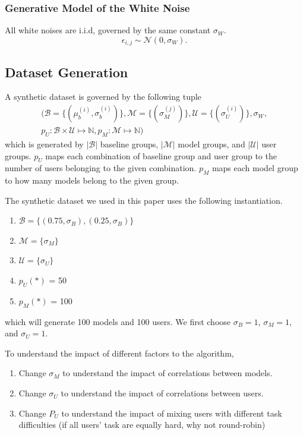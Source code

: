 \documentclass[letterpaper]{vldb}
\begin{document}
\subsubsection{Generative Model of the White Noise}

All white noises are i.i.d, governed by the same constant $\sigma_W$.
\[
\epsilon_{i,j} \sim \mathcal{N}(0, \sigma_W).
\]


\subsection{Dataset Generation}

A synthetic dataset is governed by the following tuple
\begin{eqnarray*}
( 
\mathcal{B} = \{(\mu_b^{(i)}, \sigma_b^{(i)})\},
\mathcal{M} = \{(\sigma_M^{(j)})\},
\mathcal{U} = \{(\sigma_U^{(i)})\},
\sigma_W,  \\
p_U: \mathcal{B} \times \mathcal{U} \mapsto \mathbb{N},
p_M: \mathcal{M} \mapsto \mathbb{N}
)
\end{eqnarray*}
which is generated by 
$|\mathcal{B}|$ baseline groups, 
$|\mathcal{M}|$ model groups, 
and $|\mathcal{U}|$ user groups. $p_U$
maps each combination of baseline group
and user group to the number of users
belonging to the given combination.
$p_M$ maps each model group to how many
models belong to the given group.

The synthetic dataset we used
in this paper uses the following instantiation.

\begin{enumerate}
\item $\mathcal{B} = \{(0.75, \sigma_{B}), (0.25, \sigma_{B})\}$
\item $\mathcal{M} = \{\sigma_{M}\}$
\item $\mathcal{U} = \{\sigma_U\}$
\item $p_U(*)$ = 50
\item $p_M(*)$ = 100
\end{enumerate}
which will generate 100 models and 100 users. We first
choose $\sigma_{B} = 1$, $\sigma_{M} = 1$, and $\sigma_{U} = 1$.

To understand the impact of different factors to the algorithm,
\begin{enumerate}
\item Change $\sigma_{M}$ to understand the impact of
correlations between models.
\item Change $\sigma_{U}$ to understand the impact of
correlations between users.
\item Change $P_U$ to understand the impact of
mixing users with different task difficulties (if all users' task are
equally hard, why not round-robin)
\end{enumerate}
\end{document}
